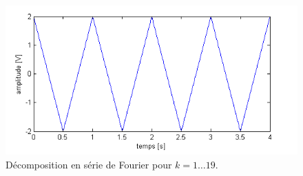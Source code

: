 \begin{figure}[ht]
	\centering
	\includegraphics[scale=0.6]{img/q1-fourier-19.png}
	\caption{Décomposition en série de Fourier pour $k=1\dots19$.}
	\label{fig:q1-fourier-19}
\end{figure}

